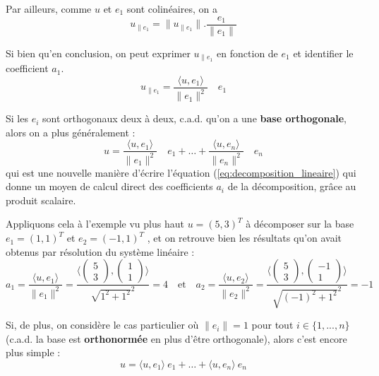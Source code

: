 Par ailleurs, comme $u$ et $e_1$ sont colinéaires, on a 
\begin{equation}
u_{\|e_1} = \|u_{\|e_1}\| . \frac{e_1}{\|e_1\|}
\end{equation}

Si bien qu'en conclusion, on peut exprimer $u_{\|e_1}$ en fonction de $e_1$ et identifier le coefficient $a_1$.
\begin{equation}
u_{\|e_1} = \frac{\langle u , e_1 \rangle}{\|e_1\|^2} \quad e_1
\end{equation}

Si les $e_i$ sont orthogonaux deux à deux, c.a.d. qu'on a une \textbf{base orthogonale}, alors on a plus généralement :
\begin{equation}
u = \frac{\langle u , e_1 \rangle}{\|e_1\|^2} \quad e_1 +\dots + \frac{\langle u , e_n \rangle}{\|e_n\|^2} \quad e_n 
\end{equation}
qui est une nouvelle manière d'écrire l'équation (\ref{eq:decomposition_lineaire}) qui donne un moyen de calcul direct des coefficients $a_i$ de la décomposition, grâce au produit scalaire.

Appliquons cela à l'exemple vu plus haut $u=(5,3)^T$ à décomposer sur la base $e_1=(1,1)^T$ et $e_2=(-1,1)^T$ , et on retrouve bien les résultats qu'on avait obtenus par résolution du système linéaire :
\begin{equation*}
a_1=\frac{\langle u , e_1 \rangle}{\|e_1\|^2} = \frac{\langle\begin{pmatrix} 5 \\ 3 \end{pmatrix},\begin{pmatrix} 1 \\ 1 \end{pmatrix}\rangle}{\sqrt{1^2+1^2}^2}=4 \quad \text{et} \quad a_2=\frac{\langle u , e_2 \rangle}{\|e_2\|^2} = \frac{\langle\begin{pmatrix} 5 \\ 3 \end{pmatrix},\begin{pmatrix} -1 \\ 1 \end{pmatrix}\rangle}{\sqrt{(-1)^2+1^2}^2}=-1 
\end{equation*}

Si, de plus, on considère le cas particulier où $\|e_i\|=1$ pour tout $i \in \{1,...,n\}$ (c.a.d. la base est \textbf{orthonormée} en plus d'être orthogonale), alors c'est encore plus simple :
\begin{equation}
u = \langle u , e_1 \rangle ~e_1 +\dots + \langle u , e_n \rangle ~e_n 
\end{equation}

